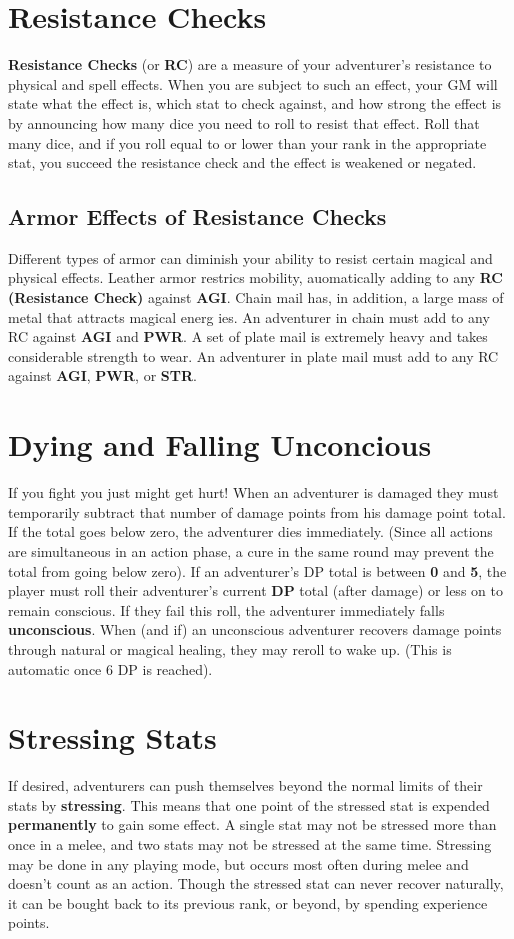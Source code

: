 \begin{multicols*}{2}
\section{Resistance Checks}
\textbf{Resistance Checks} (or \textbf{RC}) are a measure of your adventurer’s resistance to physical and spell effects. When you are subject to such an effect, your GM will state what the effect is, which stat to check against, and how strong the effect is by announcing how many dice you need to roll to resist that effect. Roll that many dice, and if you roll equal to or lower than your rank in the appropriate stat, you succeed the resistance check and the effect is weakened or negated.
\subsection{Armor Effects of Resistance Checks}
Different types of armor can diminish your ability to resist certain magical and physical effects. Leather armor
restrics mobility, auomatically adding  to any \textbf{RC (Resistance Check)} against \textbf{AGI}. Chain mail has, in addition, a large mass of metal that attracts magical energ ies. An adventurer in chain must add  to any RC against \textbf{AGI} and \textbf{PWR}. A set of plate mail is extremely heavy and takes considerable strength to wear. An adventurer in plate mail must add  to any RC against \textbf{AGI}, \textbf{PWR}, or \textbf{STR}.
\section{Dying and Falling Unconcious}
If you fight you just might get hurt! When an adventurer is damaged they must temporarily subtract that number of damage points from his damage point total. If the total goes below zero, the adventurer dies immediately. (Since all actions are simultaneous in an action phase, a cure in the same round may prevent the total from going below zero).
If an adventurer’s DP total is between \textbf{0} and \textbf{5}, the
player must roll their adventurer's current \textbf{DP} total (after damage) or less on  to remain conscious. If they fail this roll, the adventurer immediately falls \textbf{unconscious}. When (and if) an unconscious adventurer recovers damage points through natural or magical healing, they may reroll to wake up. (This is automatic once 6 DP is reached).
\section{Stressing Stats}
If desired, adventurers can push themselves beyond the normal limits of their stats by \textbf{stressing}. This means that one point of the stressed stat is expended \textbf{permanently} to gain some effect. A single stat may not be stressed more than once in a melee, and two stats may not be stressed at the same time. Stressing may be done in any playing mode, but occurs most often during melee and doesn’t count as an action. Though the stressed stat can never recover naturally, it can be bought back to its previous rank, or beyond, by spending experience points.


\end{multicols*}
